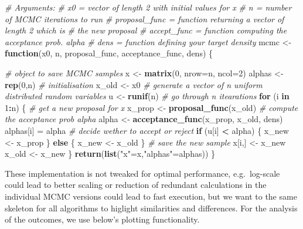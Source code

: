 \documentclass[
]{article}
\newenvironment{Shaded}{\begin{snugshade}}{\end{snugshade}}
\newcommand{\CommentTok}[1]{\textcolor[rgb]{0.56,0.35,0.01}{\textit{#1}}}
\newcommand{\ControlFlowTok}[1]{\textcolor[rgb]{0.13,0.29,0.53}{\textbf{#1}}}
\newcommand{\DataTypeTok}[1]{\textcolor[rgb]{0.13,0.29,0.53}{#1}}
\newcommand{\DecValTok}[1]{\textcolor[rgb]{0.00,0.00,0.81}{#1}}
\newcommand{\KeywordTok}[1]{\textcolor[rgb]{0.13,0.29,0.53}{\textbf{#1}}}
\newcommand{\NormalTok}[1]{#1}
\newcommand{\OperatorTok}[1]{\textcolor[rgb]{0.81,0.36,0.00}{\textbf{#1}}}
\newcommand{\StringTok}[1]{\textcolor[rgb]{0.31,0.60,0.02}{#1}}
\begin{document}
\begin{Shaded}
\begin{Highlighting}[]
\CommentTok{# Arguments:}
\CommentTok{# x0 = vector of length 2 with initial values for x}
\CommentTok{# n = number of MCMC iterations to run}
\CommentTok{# proposal_func = function returning a vector of length 2 which is }
\CommentTok{#                 the new proposal}
\CommentTok{# accept_func = function computing the acceptance prob. alpha}
\CommentTok{# dens = function defining your target density}
\NormalTok{mcmc <-}\StringTok{ }\ControlFlowTok{function}\NormalTok{(x0, n, proposal_func, acceptance_func, dens) \{}
  
  \CommentTok{# object to save MCMC samples}
\NormalTok{  x <-}\StringTok{ }\KeywordTok{matrix}\NormalTok{(}\DecValTok{0}\NormalTok{, }\DataTypeTok{nrow=}\NormalTok{n, }\DataTypeTok{ncol=}\DecValTok{2}\NormalTok{)}
\NormalTok{  alphas <-}\StringTok{ }\KeywordTok{rep}\NormalTok{(}\DecValTok{0}\NormalTok{,n)}
  \CommentTok{# initialisation}
\NormalTok{  x_old <-}\StringTok{ }\NormalTok{x0}
  \CommentTok{# generate a vector of n uniform distributed random variables}
\NormalTok{  u <-}\StringTok{ }\KeywordTok{runif}\NormalTok{(n)}
  \CommentTok{# go through n itearations}
  \ControlFlowTok{for}\NormalTok{ (i }\ControlFlowTok{in} \DecValTok{1}\OperatorTok{:}\NormalTok{n) \{}
    \CommentTok{# get a new proposal for x}
\NormalTok{    x_prop <-}\StringTok{ }\KeywordTok{proposal_func}\NormalTok{(x_old)}
    \CommentTok{# compute the acceptance prob alpha}
\NormalTok{    alpha <-}\StringTok{ }\KeywordTok{acceptance_func}\NormalTok{(x_prop, x_old, dens)}
\NormalTok{    alphas[i] =}\StringTok{ }\NormalTok{alpha}
    \CommentTok{# decide wether to accept or reject}
    \ControlFlowTok{if}\NormalTok{ (u[i] }\OperatorTok{<}\StringTok{ }\NormalTok{alpha) \{}
\NormalTok{      x_new <-}\StringTok{ }\NormalTok{x_prop}
\NormalTok{    \} }\ControlFlowTok{else}\NormalTok{ \{}
\NormalTok{      x_new <-}\StringTok{ }\NormalTok{x_old}
\NormalTok{    \}}
    \CommentTok{# save the new sample}
\NormalTok{    x[i,] <-}\StringTok{ }\NormalTok{x_new}
\NormalTok{    x_old <-}\StringTok{ }\NormalTok{x_new}
\NormalTok{  \}}
  \KeywordTok{return}\NormalTok{(}\KeywordTok{list}\NormalTok{(}\StringTok{"x"}\NormalTok{=x,}\StringTok{"alphas"}\NormalTok{=alphas))}
\NormalTok{\}}
\end{Highlighting}
\end{Shaded}

These implementation is not tweaked for optimal performance,
e.g.~log-scale could lead to better scaling or reduction of redundant
calculations in the individual MCMC versions could lead to fast
execution, but we want to the same skeleton for all algorithms to
higlight similarities and differences. For the analysis of the outcomes,
we use below's plotting functionality.
\end{document}
